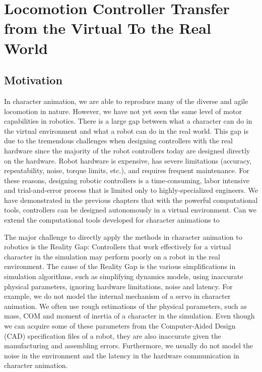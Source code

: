\chapter{Locomotion Controller Transfer from the Virtual To the Real World}
\section{Motivation}
In character animation, we are able to reproduce many of the diverse and agile locomotion in nature. However, we have not yet seen the same level of motor capabilities in robotics. There is a large gap between what a character can do in the virtual environment and what a robot can do in the real world. This gap is due to the tremendous challenges when designing controllers with the real hardware since the majority of the robot controllers today are designed directly on the hardware. Robot hardware is expensive, has severe limitations (accuracy, repeatability, noise, torque limits, etc.), and requires frequent maintenance. For these reasons, designing robotic controllers is a time-consuming, labor intensive and trial-and-error process that is limited only to highly-specialized engineers. We have demonstrated in the previous chapters that with the powerful computational tools, controllers can be designed autonomously in a virtual environment. Can we extend the computational tools developed for character animations to  

The major challenge to directly apply the methods in character animation to robotics is the Reality Gap: Controllers that work effectively for a virtual character in the simulation may perform poorly on a robot in the real environment. The cause of the Reality Gap is the various simplifications in simulation algorithms, such as simplifying dynamics models, using inaccurate physical parameters, ignoring hardware limitations, noise and latency. For example, we do not model the internal mechanism of a servo in character animation. We often use rough estimations of the physical parameters, such as mass, COM and moment of inertia of a character in the simulation. Even though we can acquire some of these parameters from the Computer-Aided Design (CAD) specification files of a robot, they are also inaccurate given the manufacturing and assembling errors. Furthermore, we usually do not model the noise in the environment and the latency in the hardware communication in character animation.

